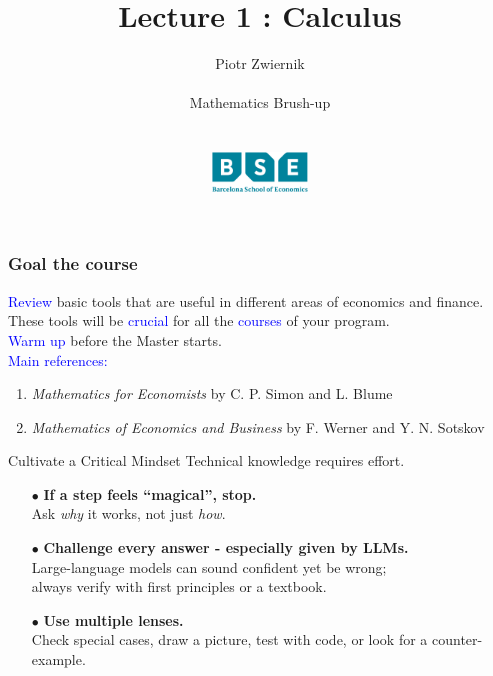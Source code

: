 \documentclass[11pt,aspectratio=169]{beamer}
\title[Calculus and Linear Algebra]{Lecture 1 : Calculus}
\author[Piotr Zwiernik, Barcelona School of Economics]{Piotr Zwiernik \\ $\;$\\
Mathematics Brush-up\\ $\;$\\ $\;$\\
\includegraphics[width=1in]{img/bse.png}  
}
\date{}
\begin{document}
\begin{frame}
\titlepage
\end{frame}





\begin{frame}
\frametitle{Goal the course}
\textcolor{blue}{Review} basic tools that are useful in different areas of economics and finance.\\[6mm]

These tools will be \textcolor{blue}{crucial} for all the \textcolor{blue}{courses} of your program.\\[6mm]

\textcolor{blue}{Warm up} before the Master starts.\\[6mm]

\textcolor{blue}{Main references:} 
\begin{enumerate}
\item {\it Mathematics for Economists} by C. P. Simon and L. Blume

\item {\it Mathematics of Economics and Business} by F. Werner and Y. N. Sotskov
\end{enumerate}


\end{frame}

\begin{frame}{Cultivate a Critical Mindset}
Technical knowledge requires effort. 
\begin{itemize}
  \item [$\bullet$] \textbf{If a step feels ``magical'', stop.} \\ 
        \quad Ask \emph{why} it works, not just \emph{how}.  \\[5mm]
        \smallskip
  \item [$\bullet$] \textbf{Challenge every answer - especially given by LLMs.} \\ 
        \quad Large-language models can sound confident yet be wrong;\\  
        \qquad always verify with first principles or a textbook.\\[5mm]
        \smallskip
  \item [$\bullet$] \textbf{Use multiple lenses.}\\  
        Check special cases, draw a picture, test with code, or look for a counter-example.
\end{itemize}
\end{frame}
\end{document}
